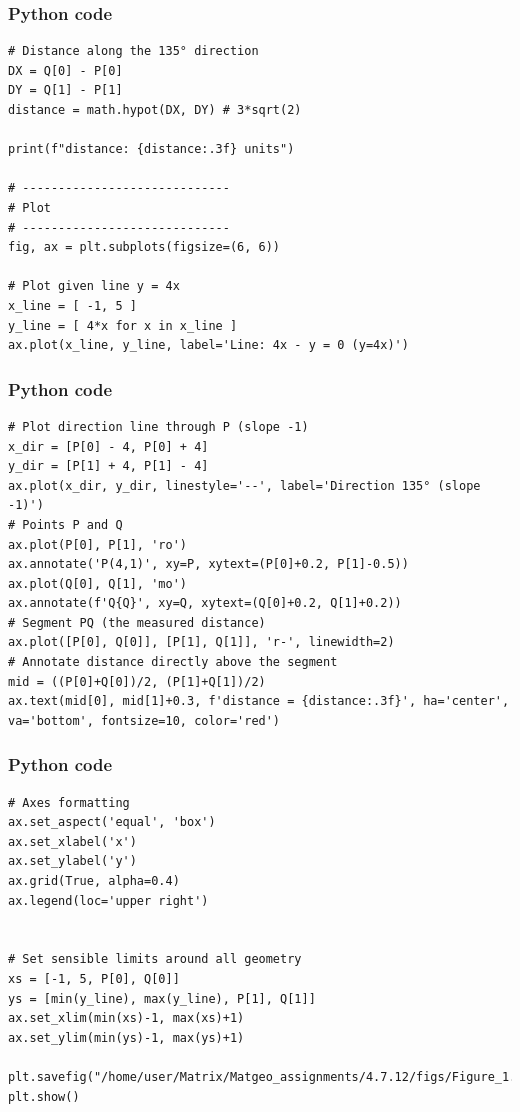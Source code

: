 \documentclass{beamer}
\begin{document}
\begin{frame}[fragile]
    \frametitle{Python code}

    \begin{lstlisting}
# Distance along the 135° direction
DX = Q[0] - P[0]
DY = Q[1] - P[1]
distance = math.hypot(DX, DY) # 3*sqrt(2)

print(f"distance: {distance:.3f} units")

# -----------------------------
# Plot
# -----------------------------
fig, ax = plt.subplots(figsize=(6, 6))

# Plot given line y = 4x
x_line = [ -1, 5 ]
y_line = [ 4*x for x in x_line ]
ax.plot(x_line, y_line, label='Line: 4x - y = 0 (y=4x)')
    \end{lstlisting}
\end{frame}

\begin{frame}[fragile]
    \frametitle{Python code}

    \begin{lstlisting}
# Plot direction line through P (slope -1)
x_dir = [P[0] - 4, P[0] + 4]
y_dir = [P[1] + 4, P[1] - 4]
ax.plot(x_dir, y_dir, linestyle='--', label='Direction 135° (slope -1)')
# Points P and Q
ax.plot(P[0], P[1], 'ro')
ax.annotate('P(4,1)', xy=P, xytext=(P[0]+0.2, P[1]-0.5))
ax.plot(Q[0], Q[1], 'mo')
ax.annotate(f'Q{Q}', xy=Q, xytext=(Q[0]+0.2, Q[1]+0.2))
# Segment PQ (the measured distance)
ax.plot([P[0], Q[0]], [P[1], Q[1]], 'r-', linewidth=2)
# Annotate distance directly above the segment
mid = ((P[0]+Q[0])/2, (P[1]+Q[1])/2)
ax.text(mid[0], mid[1]+0.3, f'distance = {distance:.3f}', ha='center', va='bottom', fontsize=10, color='red')

    \end{lstlisting}
\end{frame}

\begin{frame}[fragile]
    \frametitle{Python code}

    \begin{lstlisting}
# Axes formatting
ax.set_aspect('equal', 'box')
ax.set_xlabel('x')
ax.set_ylabel('y')
ax.grid(True, alpha=0.4)
ax.legend(loc='upper right')


# Set sensible limits around all geometry
xs = [-1, 5, P[0], Q[0]]
ys = [min(y_line), max(y_line), P[1], Q[1]]
ax.set_xlim(min(xs)-1, max(xs)+1)
ax.set_ylim(min(ys)-1, max(ys)+1)

plt.savefig("/home/user/Matrix/Matgeo_assignments/4.7.12/figs/Figure_1.png")
plt.show()
    \end{lstlisting}
\end{frame}
\end{document}
